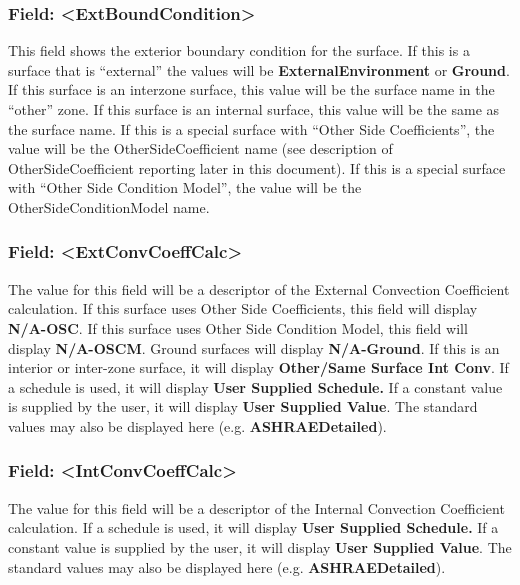 \subsubsection{Field: \textless{}ExtBoundCondition\textgreater{}}\label{field-extboundcondition}

This field shows the exterior boundary condition for the surface. If this is a surface that is ``external'' the values will be \textbf{ExternalEnvironment} or \textbf{Ground}. If this surface is an interzone surface, this value will be the surface name in the ``other'' zone. If this surface is an internal surface, this value will be the same as the surface name. If this is a special surface with ``Other Side Coefficients'', the value will be the OtherSideCoefficient name (see description of OtherSideCoefficient reporting later in this document). If this is a special surface with ``Other Side Condition Model'', the value will be the OtherSideConditionModel name.

\subsubsection{Field: \textless{}ExtConvCoeffCalc\textgreater{}}\label{field-extconvcoeffcalc}

The value for this field will be a descriptor of the External Convection Coefficient calculation. If this surface uses Other Side Coefficients, this field will display \textbf{N/A-OSC}. If this surface uses Other Side Condition Model, this field will display \textbf{N/A-OSCM}. Ground surfaces will display \textbf{N/A-Ground}. If this is an interior or inter-zone surface, it will display \textbf{Other/Same Surface Int Conv}. If a schedule is used, it will display \textbf{User Supplied Schedule.} If a constant value is supplied by the user, it will display \textbf{User Supplied Value}. The standard values may also be displayed here (e.g. \textbf{ASHRAEDetailed}).

\subsubsection{Field: \textless{}IntConvCoeffCalc\textgreater{}}\label{field-intconvcoeffcalc}

The value for this field will be a descriptor of the Internal Convection Coefficient calculation. If a schedule is used, it will display \textbf{User Supplied Schedule.} If a constant value is supplied by the user, it will display \textbf{User Supplied Value}. The standard values may also be displayed here (e.g. \textbf{ASHRAEDetailed}).

